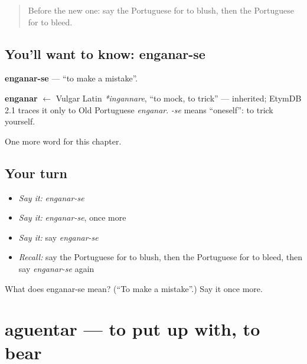 \label{lesson:PT-C147-enganar-se}



\begin{quote}
Before the new one: say the Portuguese for to blush, then the Portuguese for to bleed.
\end{quote}

\subsection*{You'll want to know: enganar-se}
\textbf{enganar-se} — \textquotedblleft{}to make a mistake\textquotedblright{}.

\begin{cousinweb}
\textbf{enganar} $\leftarrow$ Vulgar Latin \emph{*ingannare}, \textquotedblleft{}to mock, to trick\textquotedblright{} — inherited; EtymDB 2.1 traces it only to Old Portuguese \emph{enganar}. \emph{-se} means \textquotedblleft{}oneself\textquotedblright{}: to trick yourself.
\end{cousinweb}

\begin{grammarlens}[title={What you've built}]
One more word for this chapter.
\end{grammarlens}

\subsection*{Your turn}
\begin{itemize}
\raggedright
  \item \emph{Say it:} \emph{enganar-se}
  \item \emph{Say it:} \emph{enganar-se}, once more
  \item \emph{Say it:} say \emph{enganar-se}
  \item \emph{Recall:} say the Portuguese for to blush, then the Portuguese for to bleed, then say \emph{enganar-se} again
\end{itemize}

\begin{tcolorbox}[breakable,colback=teal!4,colframe=teal!35!black,title={Before you move on}]
What does enganar-se mean? (\textquotedblleft{}To make a mistake\textquotedblright{}.) Say it once more.
\end{tcolorbox}
\section[aguentar]{aguentar — to put up with, to bear}

